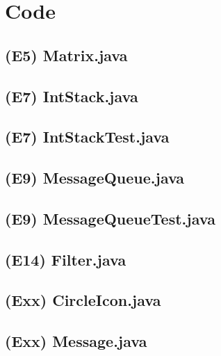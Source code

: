 \documentclass[main.tex]{subfiles}
\begin{document}
\section*{Code}

\subsection*{(E5) Matrix.java}


\newpage
\subsection*{(E7) IntStack.java}


\newpage
\subsection*{(E7) IntStackTest.java}


\newpage
\subsection*{(E9) MessageQueue.java}


\newpage
\subsection*{(E9) MessageQueueTest.java}


\newpage
\subsection*{(E14) Filter.java}


\newpage
\subsection*{(Exx) CircleIcon.java}


\newpage
\subsection*{(Exx) Message.java}

\end{document}
